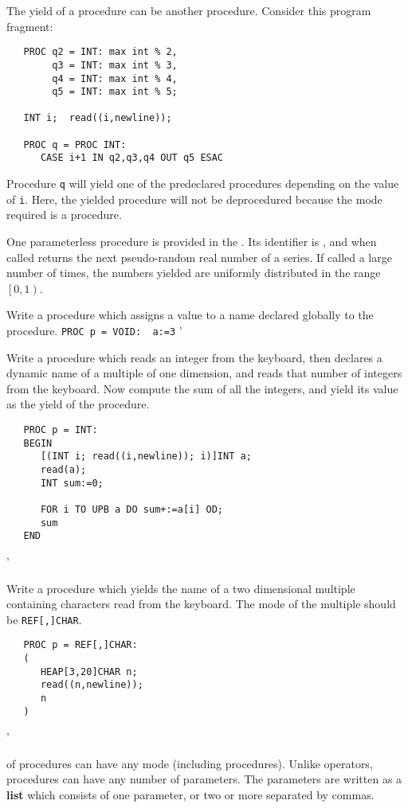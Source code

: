 The yield of a procedure can be another procedure. Consider this
program fragment:
\begin{verbatim}
   PROC q2 = INT: max int % 2,
        q3 = INT: max int % 3,
        q4 = INT: max int % 4,
        q5 = INT: max int % 5;

   INT i;  read((i,newline));

   PROC q = PROC INT:
      CASE i+1 IN q2,q3,q4 OUT q5 ESAC
\end{verbatim}
\noindent
Procedure \verb|q| will yield one of the predeclared procedures
depending on the value of \verb|i|. Here, the yielded procedure will
not be deprocedured because the mode required is a procedure.

One parameterless procedure is provided in the .
Its identifier is , and when called returns the next
pseudo-random real number of a series. If called a large number of
times, the numbers yielded are uniformly distributed in the range
$\left[0,1\right)$.

\begin{exercise}
\item Write a procedure which assigns a value to a name declared
globally to the procedure. \ans \verb|PROC p = VOID:  a:=3|
'
\item Write a procedure which reads an integer from the keyboard, then
declares a dynamic name of a multiple of one dimension, and reads that
number of integers from the keyboard. Now compute the sum of all the
integers, and yield its value as the yield of the procedure.
\ans \ %
\begin{verbatim}
   PROC p = INT:
   BEGIN
      [(INT i; read((i,newline)); i)]INT a;
      read(a);
      INT sum:=0;

      FOR i TO UPB a DO sum+:=a[i] OD;
      sum
   END
\end{verbatim}
'
\item Write a procedure which yields the name of a two dimensional
multiple containing characters read from the keyboard. The mode of
the multiple should be \verb|REF[,]CHAR|. \ans \ %
\begin{verbatim}
   PROC p = REF[,]CHAR:
   (
      HEAP[3,20]CHAR n;
      read((n,newline));
      n
   )
\end{verbatim}
'
\end{exercise}

 of procedures can have any
mode (including procedures).  Unlike operators, procedures can have
any number of parameters.  The parameters are written as a
 {\bf list} which consists of one
parameter, or two or more separated by commas.

